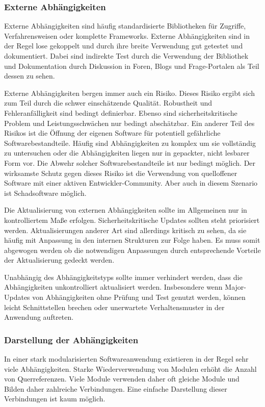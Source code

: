 \subsubsection{Externe Abhängigkeiten}

Externe Abhängigkeiten sind häufig standardisierte Bibliotheken für Zugriffe, Verfahrensweisen oder komplette Frameworks. Externe Abhängigkeiten sind in der Regel lose gekoppelt und durch ihre breite Verwendung gut getestet und dokumentiert. Dabei sind indirekte Test durch die Verwendung der Bibliothek und Dokumentation durch Diskussion in Foren, Blogs und Frage-Portalen als Teil dessen zu sehen. 

Externe Abhängigkeiten bergen immer auch ein Risiko. Dieses Risiko ergibt sich zum Teil durch die schwer einschätzende Qualität. Robustheit und Fehleranfälligkeit sind bedingt definierbar. Ebenso sind sicherheitskritische Problem und Leistungsschwächen nur bedingt abschätzbar. Ein anderer Teil des Risikos ist die Öffnung der eigenen Software für potentiell gefährliche Softwarebestandteile. Häufig sind Abhängigkeiten zu komplex um sie vollständig zu untersuchen oder die Abhängigkeiten liegen nur in gepackter, nicht lesbarer Form vor. Die Abwehr solcher Softwarebestandteile ist nur bedingt möglich. Der wirksamste Schutz gegen dieses Risiko ist die Verwendung von quelloffener Software mit einer aktiven Entwickler-Community. Aber auch in diesem Szenario ist Schadsoftware möglich.

Die Aktualisierung von externen Abhängigkeiten sollte im Allgemeinen nur in kontrolliertem Maße erfolgen. Sicherheitskritische Updates sollten steht priorisiert werden. Aktualisierungen anderer Art sind allerdings kritisch zu sehen, da sie häufig mit Anpassung in den internen Strukturen zur Folge haben. Es muss somit abgewogen werden ob die notwendigen Anpassungen durch entsprechende Vorteile der Aktualisierung gedeckt werden.

Unabhängig des Abhängigkeitstyps sollte immer verhindert werden, dass die Abhängigkeiten unkontrolliert aktualisiert werden. Insbesondere wenn Major-Updates von Abhängigkeiten ohne Prüfung und Test genutzt werden, können leicht Schnittstellen brechen oder unerwartete Verhaltensmuster in der Anwendung auftreten.

\subsubsection{Darstellung der Abhängigkeiten}

In einer stark modularisierten Softwareanwendung existieren in der Regel sehr viele Abhängigkeiten. Starke Wiederverwendung von Modulen erhöht die Anzahl von Querreferenzen. Viele Module verwenden daher oft gleiche Module und Bilden daher zahlreiche Verbindungen. Eine einfache Darstellung dieser Verbindungen ist kaum möglich.


